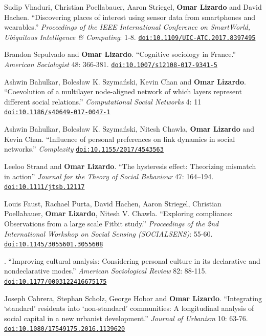 
\ind Sudip Vhaduri, Christian Poellabauer, Aaron Striegel, {\bf Omar Lizardo} and David Hachen. ``Discovering places of interest using sensor data from smartphones and wearables.'' {\em Proceedings of the IEEE International Conference on SmartWorld, Ubiquitous Intelligence \& Computing}: 1-8. \href{https://doi.org/10.1109/UIC-ATC.2017.8397495}{\nolinkurl{doi:10.1109/UIC-ATC.2017.8397495}}

\ind Brandon Sepulvado and {\bf Omar Lizardo}. ``Cognitive sociology in France.'' {\em American Sociologist} 48: 366-381. 
\href{https://doi.org/10.1007/s12108-017-9341-5}{\nolinkurl{doi:10.1007/s12108-017-9341-5}}

\ind Ashwin Bahulkar, Boles\l{}aw K. Szyma\'{n}ski, Kevin Chan and {\bf Omar Lizardo}. ``Coevolution of a multilayer node-aligned network of which layers represent different social relations.'' {\em Computational Social Networks} 4: 11 \href{https://doi.org/10.1186/s40649-017-0047-1}{\nolinkurl{doi:10.1186/s40649-017-0047-1}} 

\ind Ashwin Bahulkar, Boles\l{}aw K. Szyma\'{n}ski, Nitesh Chawla, {\bf Omar Lizardo} and Kevin Chan. ``Influence of personal preferences on link dynamics in social networks.'' {\em Complexity} \href{https://doi.org/10.1155/2017/4543563}{\nolinkurl{doi:10.1155/2017/4543563}}

\ind Leeloo Strand and {\bf Omar Lizardo}. ``The hysteresis effect: Theorizing mismatch in action'' {\em Journal for the Theory of Social Behaviour} 47: 164–194. \href{https://doi.org/10.1111/jtsb.12117}{\nolinkurl{doi:10.1111/jtsb.12117}}

\ind Louis Faust, Rachael Purta, David Hachen, Aaron Striegel, Christian Poellabauer, {\bf Omar Lizardo}, Nitesh V. Chawla. ``Exploring compliance: Observations from a large scale Fitbit study.'' {\em Proceedings of the 2nd International Workshop on Social Sensing (SOCIALSENS)}: 55-60. \href{https://doi.org/10.1145/3055601.3055608}{\nolinkurl{doi:10.1145/3055601.3055608}}

. ``Improving cultural analysis: Considering personal culture in its declarative and nondeclarative modes.'' {\em American Sociological Review} 82: 88-115. \href{https://doi.org/10.1177/0003122416675175}{\nolinkurl{doi:10.1177/0003122416675175}} 

\ind Joseph Cabrera, Stephan Scholz, George Hobor and {\bf Omar Lizardo}. ``Integrating `standard' residents into `non-standard' communities: A longitudinal analysis of social capital in a new urbanist development.''  {\em Journal of Urbanism} 10: 63-76. \href{https://doi.org/10.1080/17549175.2016.1139620}{\nolinkurl{doi:10.1080/17549175.2016.1139620}}
